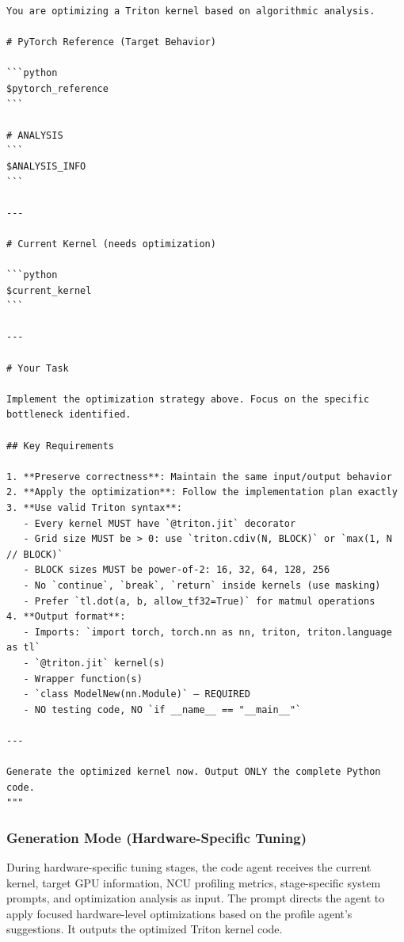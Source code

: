\begin{mdframed}[linewidth=1pt, linecolor=black, backgroundcolor=gray!5]
\begin{lstlisting}
You are optimizing a Triton kernel based on algorithmic analysis.

# PyTorch Reference (Target Behavior)

```python
$pytorch_reference
```

# ANALYSIS
```
$ANALYSIS_INFO
```

---

# Current Kernel (needs optimization)

```python
$current_kernel
```

---

# Your Task

Implement the optimization strategy above. Focus on the specific bottleneck identified.

## Key Requirements

1. **Preserve correctness**: Maintain the same input/output behavior
2. **Apply the optimization**: Follow the implementation plan exactly
3. **Use valid Triton syntax**:
   - Every kernel MUST have `@triton.jit` decorator
   - Grid size MUST be > 0: use `triton.cdiv(N, BLOCK)` or `max(1, N // BLOCK)`
   - BLOCK sizes MUST be power-of-2: 16, 32, 64, 128, 256
   - No `continue`, `break`, `return` inside kernels (use masking)
   - Prefer `tl.dot(a, b, allow_tf32=True)` for matmul operations
4. **Output format**:
   - Imports: `import torch, torch.nn as nn, triton, triton.language as tl`
   - `@triton.jit` kernel(s)
   - Wrapper function(s)
   - `class ModelNew(nn.Module)` — REQUIRED
   - NO testing code, NO `if __name__ == "__main__"`

---

Generate the optimized kernel now. Output ONLY the complete Python code.
"""
\end{lstlisting}
\end{mdframed}

\subsubsection{Generation Mode (Hardware-Specific Tuning)}

During hardware-specific tuning stages, the code agent receives the current kernel, target GPU information, NCU profiling metrics, stage-specific system prompts, and optimization analysis as input. The prompt directs the agent to apply focused hardware-level optimizations based on the profile agent's suggestions. It outputs the optimized Triton kernel code.

